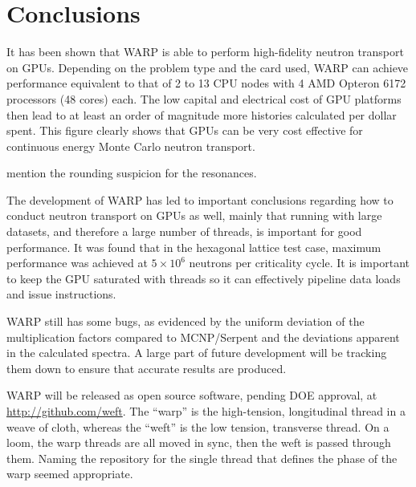 \documentclass[preprint,12pt]{elsarticle}
\begin{document}

\section{Conclusions}
\label{sec:conc}

It has been shown that WARP is able to perform high-fidelity neutron transport on GPUs.  Depending on the problem type and the card used, WARP can achieve performance equivalent to that of 2 to 13 CPU nodes with 4 AMD Opteron 6172 processors (48 cores) each.  The low capital and electrical cost of GPU platforms then lead to at least an order of magnitude more histories calculated per dollar spent.  This figure clearly shows that GPUs can be  very cost effective for continuous energy Monte Carlo neutron transport.

mention the rounding suspicion for the resonances.

The development of WARP has led to important conclusions regarding how to conduct neutron transport on GPUs as well, mainly that running with large datasets, and therefore a large number of threads, is important for good performance.  It was found that in the hexagonal lattice test case, maximum performance was achieved at $5\times10^6$ neutrons per criticality cycle.  It is important to keep the GPU saturated with threads so it can effectively pipeline data loads and issue instructions.  

WARP still has some bugs, as evidenced by the uniform deviation of the multiplication factors compared to MCNP/Serpent and the deviations apparent in the calculated spectra.  A large part of future development will be tracking them down to ensure that accurate results are produced.

WARP will be released as open source software, pending DOE approval, at \url{http://github.com/weft}. The ``warp'' is the high-tension, longitudinal thread in a weave of cloth, whereas the ``weft'' is the low tension, transverse thread.  On a loom, the warp threads are all moved in sync, then the weft is passed through them.  Naming the repository for the single thread that defines the phase of the warp seemed appropriate.
\end{document}
